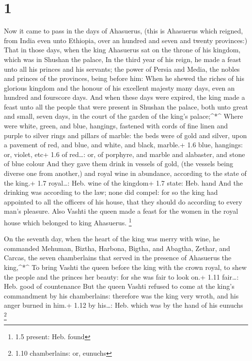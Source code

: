 \hypertarget{section}{%
\section{1}\label{section}}

 Now it came to pass in the days of Ahasuerus, (this is
Ahasuerus which reigned, from India even unto Ethiopia, over an hundred
and seven and twenty provinces:)  That in those days, when
the king Ahasuerus sat on the throne of his kingdom, which was in
Shushan the palace,  In the third year of his reign, he made
a feast unto all his princes and his servants; the power of Persia and
Media, the nobles and princes of the provinces, being before him:
 When he shewed the riches of his glorious kingdom and the
honour of his excellent majesty many days, even an hundred and fourscore
days.  And when these days were expired, the king made a
feast unto all the people that were present in Shushan the palace, both
unto great and small, seven days, in the court of the garden of the
king's palace;\^{}*\^{}  Where were white, green, and blue,
hangings, fastened with cords of fine linen and purple to silver rings
and pillars of marble: the beds were of gold and silver, upon a pavement
of red, and blue, and white, and black, marble.+ 1.6 blue, hangings: or,
violet, etc+ 1.6 of red\ldots: or, of porphyre, and marble and
alabaster, and stone of blue colour  And they gave them
drink in vessels of gold, (the vessels being diverse one from another,)
and royal wine in abundance, according to the state of the king.+ 1.7
royal\ldots: Heb. wine of the kingdom+ 1.7 state: Heb. hand 
And the drinking was according to the law; none did compel: for so the
king had appointed to all the officers of his house, that they should do
according to every man's pleasure.  Also Vashti the queen
made a feast for the women in the royal house which belonged to king
Ahasuerus. \footnote{1.5 present: Heb. found}

 On the seventh day, when the heart of the king was merry
with wine, he commanded Mehuman, Biztha, Harbona, Bigtha, and Abagtha,
Zethar, and Carcas, the seven chamberlains that served in the presence
of Ahasuerus the king,\^{}*\^{}  To bring Vashti the queen
before the king with the crown royal, to shew the people and the princes
her beauty: for she was fair to look on.+ 1.11 fair\ldots: Heb. good of
countenance  But the queen Vashti refused to come at the
king's commandment by his chamberlains: therefore was the king very
wroth, and his anger burned in him.+ 1.12 by his\ldots: Heb. which was
by the hand of his eunuchs \footnote{1.10 chamberlains: or, eunuchs}

